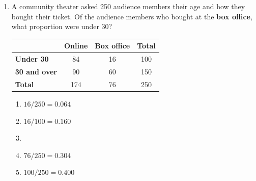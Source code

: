 \documentclass[12pt]{article}
\begin{document}
\begin{enumerate}[leftmargin=1.9em, itemsep=0.13in]

  \boxguard[12]
  \item \begin{minipage}[t]{0.44\linewidth}\raggedright
        A community theater asked 250 audience members their age and how they bought their
        ticket. Of the audience members who bought at the \textbf{box office}, what proportion
        were under 30?
        \end{minipage}\hfill
        \begin{minipage}[t]{0.52\linewidth}
        \centering\small
        \renewcommand{\arraystretch}{1.15}
        \begin{tabular}[t]{@{} l | c c | c @{}}
         & \textbf{Online} & \textbf{Box office} & \textbf{Total} \\ \hline
        \textbf{Under 30} & 84 & 16 & 100 \\
        \textbf{30 and over} & 90 & 60 & 150 \\ \hline
        \textbf{Total} & 174 & 76 & 250 \\
        \end{tabular}
        \end{minipage}
        \begin{enumerate}[label=\textbf{(\Alph*)}, leftmargin=2.2em, itemsep=2pt]
          \item $16/250 = 0.064$
          \item $16/100 = 0.160$
          \item {}
          \item $76/250 = 0.304$
          \item $100/250 = 0.400$\hfill{}\rule[-0.2in]{0pt}{0.48in}
        \end{enumerate}


\end{enumerate}
\end{document}
